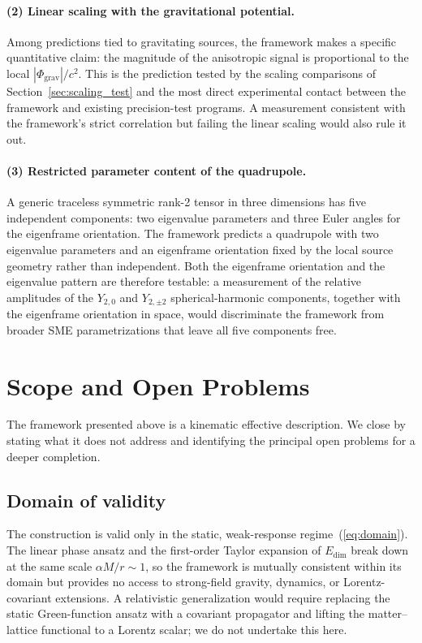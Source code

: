 \documentclass[pdflatex,sn-mathphys-num]{sn-jnl}%
\theoremstyle{thmstyleone}%
\theoremstyle{thmstyletwo}%
\theoremstyle{thmstylethree}%
\begin{document}
\paragraph{(2) Linear scaling with the gravitational potential.}
Among predictions tied to gravitating sources, the framework
makes a specific quantitative claim: the magnitude of the
anisotropic signal is proportional to the local
$|\Phi_{\mathrm{grav}}|/c^2$. This is the prediction tested by
the scaling comparisons of Section~\ref{sec:scaling_test} and
the most direct experimental contact between the framework
and existing precision-test programs. A measurement consistent
with the framework's strict correlation but failing the linear
scaling would also rule it out.

\paragraph{(3) Restricted parameter content of the quadrupole.}
A generic traceless symmetric rank-2 tensor in three
dimensions has five independent components: two eigenvalue
parameters and three Euler angles for the eigenframe
orientation. The framework predicts a quadrupole with two
eigenvalue parameters and an eigenframe orientation fixed by
the local source geometry rather than independent. Both the
eigenframe orientation and the eigenvalue pattern are
therefore testable: a measurement of the relative amplitudes
of the $Y_{2,0}$ and $Y_{2,\pm 2}$ spherical-harmonic
components, together with the eigenframe orientation in space,
would discriminate the framework from broader SME
parametrizations that leave all five components free.


\section{Scope and Open Problems}
\label{sec:scope}

The framework presented above is a kinematic effective
description. We close by stating what it does not address and
identifying the principal open problems for a deeper
completion.

\subsection{Domain of validity}

The construction is valid only in the static, weak-response
regime~(\ref{eq:domain}). The linear phase ansatz and the
first-order Taylor expansion of $E_{\mathrm{dim}}$ break down
at the same scale $\alpha M/r\sim 1$, so the framework is
mutually consistent within its domain but provides no access
to strong-field gravity, dynamics, or Lorentz-covariant
extensions. A relativistic generalization would require
replacing the static Green-function ansatz with a covariant
propagator and lifting the matter--lattice functional to a
Lorentz scalar; we do not undertake this here.
\end{document}
